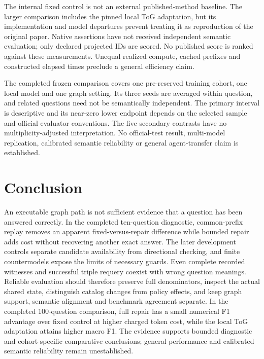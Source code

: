 \documentclass[10pt]{article}
\begin{document}
The internal fixed control is not an external published-method baseline. The larger comparison includes the pinned local ToG adaptation, but its implementation and model departures prevent treating it as reproduction of the original paper. Native assertions have not received independent semantic evaluation; only declared projected IDs are scored. No published score is ranked against these measurements. Unequal realized compute, cached prefixes and constructed elapsed times preclude a general efficiency claim.\par

The completed frozen comparison covers one pre-reserved training cohort, one local model and one graph setting. Its three seeds are averaged within question, and related questions need not be semantically independent. The primary interval is descriptive and its near-zero lower endpoint depends on the selected sample and official evaluator conventions. The five secondary contrasts have no multiplicity-adjusted interpretation. No official-test result, multi-model replication, calibrated semantic reliability or general agent-transfer claim is established.\par

\section{Conclusion}

An executable graph path is not sufficient evidence that a question has been answered correctly. In the completed ten-question diagnostic, common-prefix replay removes an apparent fixed-versus-repair difference while bounded repair adds cost without recovering another exact answer. The later development controls separate candidate availability from directional checking, and finite countermodels expose the limits of necessary guards. Even complete recorded witnesses and successful triple requery coexist with wrong question meanings. Reliable evaluation should therefore preserve full denominators, inspect the actual shared state, distinguish catalog changes from policy effects, and keep graph support, semantic alignment and benchmark agreement separate. In the completed 100-question comparison, full repair has a small numerical F1 advantage over fixed control at higher charged token cost, while the local ToG adaptation attains higher macro F1. The evidence supports bounded diagnostic and cohort-specific comparative conclusions; general performance and calibrated semantic reliability remain unestablished.\par
\end{document}
